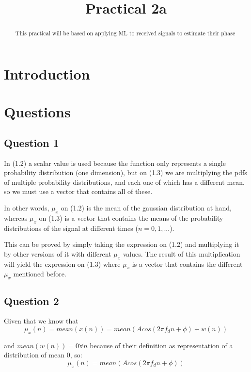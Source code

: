 \documentclass[conference,9pt]{IEEEtran}
\begin{document}
\title{Practical 2a}

\author{
}


\maketitle
\begin{abstract}
This practical will be based on applying ML to received signals to estimate their phase
\end{abstract}



\section{Introduction}

\section{Questions}

\subsection{Question 1}
In (1.2) a scalar value is used because the function only represents a single probability distribution (one dimension), but on (1.3) we are multiplying the pdfs of multiple probability distributions, and each one of which has a different mean, so we must use a vector that contains all of these.

In other words, $\mu_x$ on (1.2) is the mean of the gaussian distribution at hand, whereas $\mu_x$ on (1.3) is a vector that contains the means of the probability distributions of the signal at different times ($n=0,1,...$).

This can be proved by simply taking the expression on (1.2) and multiplying it by other versions of it with different $\mu_x$ values. The result of this multiplication will yield the expression on (1.3) where $\mu_x$ is a vector that contains the different $\mu_x$ mentioned before.
\subsection{Question 2}
Given that we know that 
$$\mu_x(n)=mean(x(n))=mean(Acos(2\pi f_dn+\phi)+w(n))$$

and $mean(w(n))=0\forall n$ because of their definition as representation of a distribution of mean 0, so:
$$\mu_x(n)=mean(Acos(2\pi f_dn+\phi))$$
\end{document}
